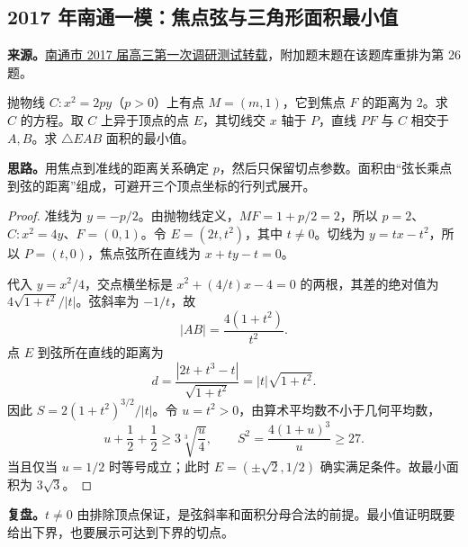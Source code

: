 \documentclass[UTF8]{ctexart}
\begin{document}
\subsection{2017 年南通一模：焦点弦与三角形面积最小值}\label{sec:c2017nt1}
\textbf{来源。}\href{https://www.renrendoc.com/paper/202096368.html}{南通市 2017 届高三第一次调研测试转载}，附加题末题在该题库重排为第 26 题。
\begin{example}[题意]
抛物线 $C:x^2=2py$（$p>0$）上有点 $M=(m,1)$，它到焦点 $F$ 的距离为 $2$。求 $C$ 的方程。取 $C$ 上异于顶点的点 $E$，其切线交 $x$ 轴于 $P$，直线 $PF$ 与 $C$ 相交于 $A,B$。求 $\triangle EAB$ 面积的最小值。
\end{example}
\textbf{思路。}用焦点到准线的距离关系确定 $p$，然后只保留切点参数。面积由“弦长乘点到弦的距离”组成，可避开三个顶点坐标的行列式展开。
\begin{proof}
准线为 $y=-p/2$。由抛物线定义，$MF=1+p/2=2$，所以 $p=2$、$C:x^2=4y$、$F=(0,1)$。令 $E=(2t,t^2)$，其中 $t\ne0$。切线为 $y=tx-t^2$，所以 $P=(t,0)$，焦点弦所在直线为 $x+ty-t=0$。

代入 $y=x^2/4$，交点横坐标是 $x^2+(4/t)x-4=0$ 的两根，其差的绝对值为 $4\sqrt{1+t^2}/|t|$。弦斜率为 $-1/t$，故
\[
|AB|=\frac{4(1+t^2)}{t^2}.
\]
点 $E$ 到弦所在直线的距离为
\[
d=\frac{|2t+t^3-t|}{\sqrt{1+t^2}}
=|t|\sqrt{1+t^2}.
\]
因此 $S=2(1+t^2)^{3/2}/|t|$。令 $u=t^2>0$，由算术平均数不小于几何平均数，
\[
u+\frac12+\frac12\geq3\sqrt[3]{\frac u4},
\qquad S^2=\frac{4(1+u)^3}{u}\geq27.
\]
当且仅当 $u=1/2$ 时等号成立；此时 $E=(\pm\sqrt2,1/2)$ 确实满足条件。故最小面积为 $\boxed{3\sqrt3}$。
\end{proof}
\textbf{复盘。}$t\ne0$ 由排除顶点保证，是弦斜率和面积分母合法的前提。最小值证明既要给出下界，也要展示可达到下界的切点。
\end{document}
